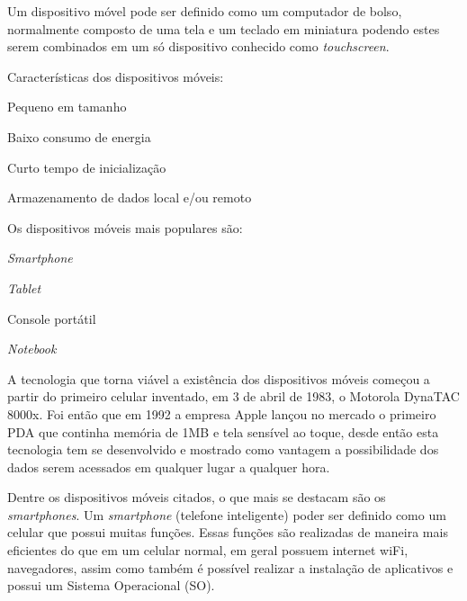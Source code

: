 Um dispositivo móvel pode ser definido como um computador de bolso, normalmente composto de uma tela e um teclado em miniatura podendo estes serem combinados em um só dispositivo conhecido como \textit{ touchscreen}.

Características dos dispositivos móveis:

\begin{alineascomponto}
 
\item Pequeno em tamanho
\item Baixo consumo de energia
\item Curto tempo de inicialização
\item Armazenamento de dados local e/ou remoto

	\end{alineascomponto}


Os dispositivos móveis mais populares são:

\begin{alineascomponto}
 
\item \textit{Smartphone}
\item \textit {Tablet}
\item Console portátil
\item \textit {Notebook}

	\end{alineascomponto}
	\cite{mov}

A tecnologia que torna viável a existência dos dispositivos móveis começou a partir do primeiro celular inventado, em 3 de abril de 1983, o Motorola DynaTAC 8000x. Foi então que em 1992 a empresa Apple lançou no mercado o primeiro PDA que continha memória de 1MB e tela sensível ao toque, desde então esta tecnologia tem se desenvolvido e mostrado como vantagem  a possibilidade dos dados serem acessados em qualquer lugar a qualquer hora. \cite{1cel}

Dentre os dispositivos móveis citados, o que mais se destacam são os \textit{smartphones}. Um \textit{smartphone} (telefone inteligente) poder ser definido como um celular que possui muitas funções. Essas funções são realizadas de maneira mais eficientes do que em um celular normal, em geral possuem internet wiFi, navegadores, assim como também é possível realizar a instalação de aplicativos e possui um Sistema Operacional (SO). \cite{smar} 

